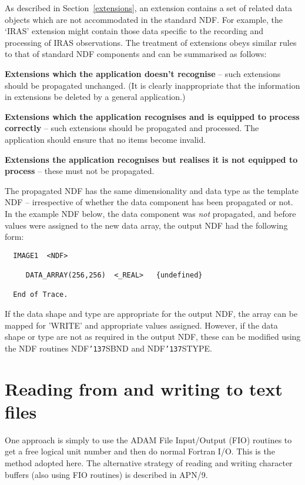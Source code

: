 \documentclass[twoside,11pt]{article}
\renewcommand{\_}{{\tt\char'137}}
\newcommand{\xlabel}[1]{}
\begin{document}
As described in Section~\ref{extensions}, an extension contains a set of
related data objects which are not accommodated in the standard NDF.
For example, the `IRAS' extension might contain those data specific to
the recording and processing of IRAS observations.
The treatment of extensions obeys similar rules to that of standard
NDF components and can be summarised as follows:
\begin{description}
\item {\bf Extensions which the application doesn't recognise} -- such
extensions should be propagated unchanged.
(It is clearly inappropriate that the information in extensions
be deleted by a general application.)


\item {\bf Extensions which the application recognises and is equipped to
process correctly} -- such extensions should be propagated and processed.
The application should ensure that no items become invalid.

\item {\bf Extensions the application recognises but realises it is not
equipped to process} -- these must not be propagated.
\end{description}

The propagated NDF has the same dimensionality and data type as the
template NDF -- irrespective of whether the data component has been
propagated or not.
In the example NDF below, the data component was {\sl not\/} propagated,
and before values were assigned to the new data array, the
output NDF had the following form:
\begin{verbatim}
  IMAGE1  <NDF>

     DATA_ARRAY(256,256)  <_REAL>   {undefined}

  End of Trace.
\end{verbatim}
If the data shape and type are appropriate for the output NDF, the array
can be mapped for 'WRITE' and appropriate values assigned.
However, if the data shape or type are not as required in
the output NDF, these can be modified using the NDF routines NDF\_SBND
and NDF\_STYPE.

\newpage
\section{Reading from and writing to text files\label{rddata}\xlabel{reading_from_and_writing_to_text_files}}

One approach is simply to use the ADAM File Input/Output
(FIO) routines to get a free logical unit number and then do normal Fortran I/O.
This is the method adopted here. The alternative strategy of reading
and writing character buffers (also using FIO routines) is described in APN/9.
\end{document}

